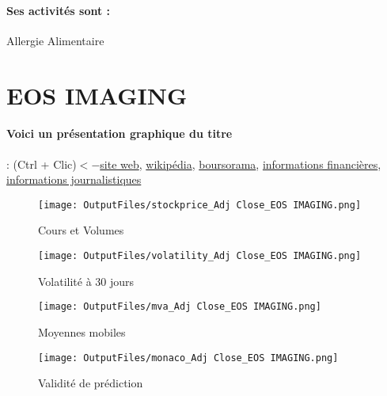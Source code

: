 \documentclass[11pt,a4paper]{report}%
\begin{document}
\paragraph{Ses activités sont : } Allergie Alimentaire 
    
    \newpage

\section{EOS IMAGING}

\paragraph{Voici un présentation graphique du titre} : (Ctrl + Clic)$<-$\href{https://eos-imaging.fr/}{site web}, \href{https://fr.wikipedia.org/wiki/EOS_imaging}{wikipédia}, \href{https://www.boursorama.com/cours/1rPEOSI}{boursorama}, \href{https://www.qwant.com/?q=site:https:%2f%2fwww.easybourse.com%2faction-societe%2fEOS-IMAGING&t=web&client=ext-firefox-hp}{informations financières}, \href{https://bourse.lerevenu.com/cours-de-bourse/fiche-valeur-synthese/EOS-IMAGING/EOSI-FR}{informations journalistiques}
\begin{figure}[!htb]
   \begin{minipage}{0.5\textwidth}
     \centering
     \texttt{[image: OutputFiles/stockprice\_Adj Close\_EOS IMAGING.png]}
     \caption{Cours et Volumes}\label{Fig:price_EOS IMAGING}
   \end{minipage}\hfill
   \begin{minipage}{0.5\textwidth}
     \centering
     \texttt{[image: OutputFiles/volatility\_Adj Close\_EOS IMAGING.png]}
     \caption{Volatilité à 30 jours}\label{Fig:volat_EOS IMAGING}
   \end{minipage}
\end{figure}
\begin{figure}[!htb]
   \begin{minipage}{0.5\textwidth}
     \centering
     \texttt{[image: OutputFiles/mva\_Adj Close\_EOS IMAGING.png]}
     \caption{Moyennes mobiles}\label{Fig:mva_EOS IMAGING}
   \end{minipage}\hfill
   \begin{minipage}{0.5\textwidth}
     \centering
     \texttt{[image: OutputFiles/monaco\_Adj Close\_EOS IMAGING.png]}
     \caption{Validité de prédiction}\label{Fig:prediction_EOS IMAGING}
   \end{minipage}
\end{figure}
\end{document}
